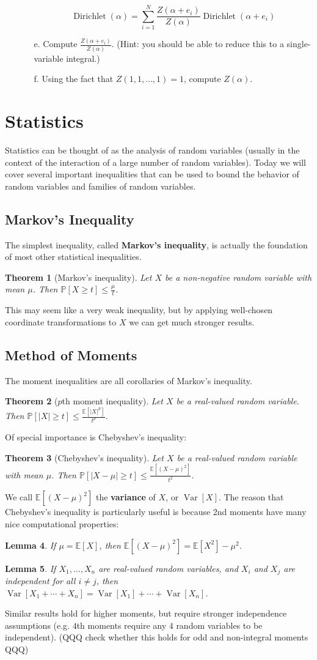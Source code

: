 \documentclass[11pt]{article}
\DeclareMathOperator{\Dirichlet}{Dirichlet}
\newtheorem{theorem}{Theorem}[section]
\newtheorem{lemma}[theorem]{Lemma}
\DeclareMathOperator{\Var}{Var}
\begin{document}
\begin{enumerate}
\begin{itemize}
\[ \Dirichlet(\alpha) = \sum_{i=1}^N \frac{Z(\alpha+e_i)}{Z(\alpha)} \Dirichlet(\alpha+e_i) \]
\item [e.] Compute $\frac{Z(\alpha+e_i)}{Z(\alpha)}$. (Hint: you should be able to reduce this to a single-variable integral.)
\item [f.] Using the fact that $Z(1,1,\ldots,1) = 1$, compute $Z(\alpha)$.
\end{itemize}
\end{enumerate}
\section{Statistics}
Statistics can be thought of as the analysis of random variables (usually in the context of the interaction of a large number of random variables). Today we will cover several important inequalities that can be used to bound the behavior of random variables and families of random variables.
\subsection{Markov's Inequality}
The simplest inequality, called \textbf{Markov's inequality}, is actually the foundation of most other statistical inequalities.
\begin{theorem}[Markov's inequality]
Let $X$ be a non-negative random variable with mean $\mu$. Then $\mathbb{P}[X \geq t] \leq \frac{\mu}{t}$.
\end{theorem}
This may seem like a very weak inequality, but by applying well-chosen coordinate transformations to $X$ we can get much stronger results.
\subsection{Method of Moments}
The moment inequalities are all corollaries of Markov's inequality.
\begin{theorem}[$p$th moment inequality]
Let $X$ be a real-valued random variable. Then $\mathbb{P}[|X| \geq t] \leq \frac{\mathbb{E}[|X|^p]}{t^p}$.
\end{theorem}
Of special importance is Chebyshev's inequality:
\begin{theorem}[Chebyshev's inequality]
Let $X$ be a real-valued random variable with mean $\mu$. Then $\mathbb{P}[|X-\mu| \geq t] \leq \frac{\mathbb{E}[(X-\mu)^2]}{t^2}$.
\end{theorem}
We call $\mathbb{E}[(X-\mu)^2]$ the \textbf{variance} of $X$, or $\Var[X]$. The reason that Chebyshev's inequality is particularly useful is because 2nd moments have many nice computational properties:
\begin{lemma}
If $\mu = \mathbb{E}[X]$, then $\mathbb{E}[(X-\mu)^2] = \mathbb{E}[X^2]-\mu^2$.
\end{lemma}
\begin{lemma}
If $X_1,\ldots,X_n$ are real-valued random variables, and $X_i$ and $X_j$ are independent for all $i \neq j$, then $\Var[X_1+\cdots+X_n] = \Var[X_1]+\cdots+\Var[X_n]$.
\end{lemma}
Similar results hold for higher moments, but require stronger independence assumptions (e.g. $4$th moments require any $4$ random variables to be independent). (QQQ check whether this holds for odd and non-integral moments QQQ)
\end{document}
